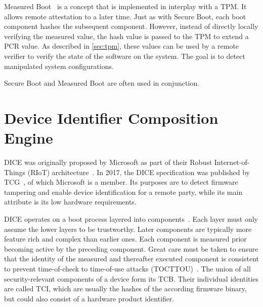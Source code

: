 Measured Boot~\cite{tcgMeasuredBoot} is a concept that is implemented in interplay with a TPM\@. It allows remote attestation to a later time. Just as with Secure Boot, each boot component hashes the subsequent component. However, instead of directly locally verifying the measured value, the hash value is passed to the TPM to extend a \ac{PCR} value. As described in \autoref{sec:tpm}, these values can be used by a remote verifier to verify the state of the software on the system. The goal is to detect manipulated system configurations.

Secure Boot and Measured Boot are often used in conjunction.

\section{Device Identifier Composition Engine}

\ac{DICE} was originally proposed by Microsoft as part of their Robust Internet-of-Things (RIoT) architecture~\cite{England2016}.
In 2017, the DICE specification was published by \ac{TCG}~\cite{tcg-microsoft-tpm}, of which Microsoft is a member.
Its purposes are to detect firmware tampering and enable device identification for a remote party, while its main attribute is its low hardware requirements.


DICE operates on a boot process layered into components~\cite{dice-layering-arch}.
Each layer must only assume the lower layers to be trustworthy.
Later components are typically more feature rich and complex than earlier ones.
Each component is measured prior becoming active by the preceding component.
Great care must be taken to ensure that the identity of the measured and thereafter executed component is consistent to prevent time-of-check to time-of-use attacks (TOCTTOU)~\cite{Hristozov2022, Carpent2018}.
The union of all security-relevant components of a device form its \ac{TCB}.
Their individual identities are called \ac{TCI}, which are usually the hashes of the according firmware binary, but could also consist of a hardware product identifier.


